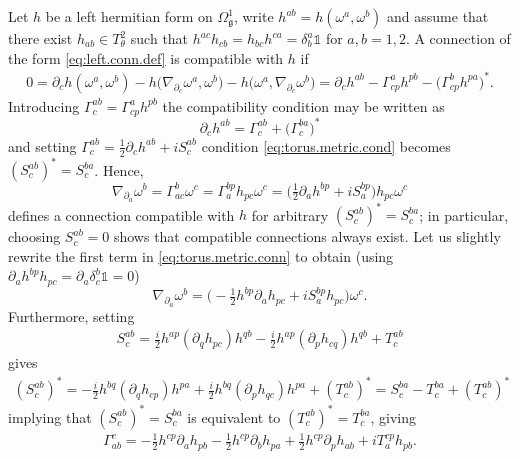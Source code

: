 \documentclass{amsart}
\newcommand{\paraa}[1]{\big(#1\big)}
\theoremstyle{definition}
\theoremstyle{remark}
\numberwithin{equation}{section}
\renewcommand{\mid}{\mathds{1}}
\renewcommand{\d}{\partial}
\newcommand{\g}{\mathfrak{g}}
\newcommand{\Omegaoneg}{\Omega^1_{\g}}
\newcommand{\Ttwotheta}{T^2_{\theta}}
\begin{document}
Let $h$ be a left hermitian form on $\Omegaoneg$, write
$h^{ab}=h(\omega^a,\omega^b)$ and assume that there exist
$h_{ab}\in\Ttwotheta$ such that
$h^{ac}h_{cb}=h_{bc}h^{ca}=\delta^a_b\mid$ for $a,b=1,2$. A connection
of the form \eqref{eq:left.conn.def} is compatible with $h$ if
\begin{align*}
  0 = \d_ch(\omega^a,\omega^b)
  -h\paraa{\nabla_{\d_c}\omega^a,\omega^b}-h\paraa{\omega^a,\nabla_{\d_c}\omega^b}
  = \d_ch^{ab}-\Gamma^a_{cp}h^{pb}-\paraa{\Gamma^b_{cp}h^{pa}}^\ast.
\end{align*}
Introducing $\Gamma^{ab}_c = \Gamma^a_{cp}h^{pb}$
the compatibility condition may be written as
\begin{equation}\label{eq:torus.metric.cond}
  \d_ch^{ab} = \Gamma^{ab}_c+\paraa{\Gamma^{ba}_c}^\ast
\end{equation}
and setting $\Gamma^{ab}_c = \frac{1}{2}\d_ch^{ab}+iS^{ab}_c$
condition \eqref{eq:torus.metric.cond} becomes
$(S^{ab}_c)^\ast=S^{ba}_c$. Hence,
\begin{equation}\label{eq:torus.metric.conn}
  \nabla_{\d_a}\omega^b = \Gamma^b_{ac}\omega^c=\Gamma^{bp}_ah_{pc}\omega^c
  = \paraa{\tfrac{1}{2}\d_ah^{bp}+iS^{bp}_a}h_{pc}\omega^c
\end{equation}
defines a connection compatible with $h$ for arbitrary
$(S^{ab}_c)^\ast=S^{ba}_c$; in particular, choosing $S^{ab}_c=0$ shows
that compatible connections always exist. Let us slightly rewrite the
first term in \eqref{eq:torus.metric.conn} to obtain (using $\d_ah^{bp}h_{pc}=\d_a\delta^b_c\mid=0$)
\begin{equation}
  \nabla_{\d_a}\omega^b = 
  \paraa{-\tfrac{1}{2}h^{bp}\d_ah_{pc}+iS^{bp}_a h_{pc}}\omega^c.
\end{equation}
Furthermore, setting
\begin{align*}
  S^{ab}_c = \tfrac{i}{2}h^{ap}(\d_qh_{pc})h^{qb}
  -\tfrac{i}{2}h^{ap}(\d_ph_{cq})h^{qb} + T^{ab}_c
\end{align*}
gives
\begin{align*}
  (S^{ab}_c)^\ast = -\tfrac{i}{2}h^{bq}(\d_qh_{cp})h^{pa}
  +\tfrac{i}{2}h^{bq}(\d_ph_{qc})h^{pa} + (T^{ab}_c)^\ast
  =S^{ba}_c-T^{ba}_c+(T^{ab}_c)^\ast
\end{align*}
implying that $(S^{ab}_c)^\ast=S^{ba}_c$ is equivalent to $(T^{ab}_c)^\ast=T^{ba}_c$, giving
\begin{align*}
  \Gamma^c_{ab} = -\tfrac{1}{2}h^{cp}\d_ah_{pb}
  -\tfrac{1}{2}h^{cp}\d_bh_{pa}
  +\tfrac{1}{2}h^{cp}\d_ph_{ab}+iT^{cp}_ah_{pb}.
\end{align*}
\end{document}
